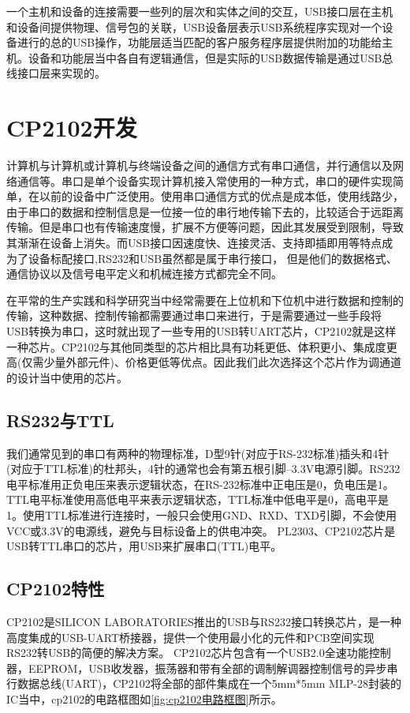 	一个主机和设备的连接需要一些列的层次和实体之间的交互，USB接口层在主机和设备间提供物理、信号包的关联，USB设备层表示USB系统程序实现对一个设备进行的总的USB操作，功能层适当匹配的客户服务程序层提供附加的功能给主机。设备和功能层当中各自有逻辑通信，但是实际的USB数据传输是通过USB总线接口层来实现的\cite{USB开发手册}\cite{圈圈教你玩USB}。


\section{CP2102开发}

	计算机与计算机或计算机与终端设备之间的通信方式有串口通信，并行通信以及网络通信等。串口是单个设备实现计算机接入常使用的一种方式，串口的硬件实现简单，在以前的设备中广泛使用。使用串口通信方式的优点是成本低，使用线路少，由于串口的数据和控制信息是一位接一位的串行地传输下去的，比较适合于远距离传输。但是串口也有传输速度慢，扩展不方便等问题，因此其发展受到限制，导致其渐渐在设备上消失。而USB接口因速度快、连接灵活、支持即插即用等特点成为了设备标配接口,RS232和USB虽然都是属于串行接口， 但是他们的数据格式、通信协议以及信号电平定义和机械连接方式都完全不同\cite{何源2006USB}。
	
	在平常的生产实践和科学研究当中经常需要在上位机和下位机中进行数据和控制的传输，这种数据、控制传输都需要通过串口来进行，于是需要通过一些手段将USB转换为串口，这时就出现了一些专用的USB转UART芯片，CP2102就是这样一种芯片。CP2102与其他同类型的芯片相比具有功耗更低、体积更小、集成度更高(仅需少量外部元件)、价格更低等优点。因此我们此次选择这个芯片作为调通道的设计当中使用的芯片。	

\subsection{RS232与TTL}
	我们通常见到的串口有两种的物理标准，D型9针(对应于RS-232标准)插头和4针(对应于TTL标准)的杜邦头，4针的通常也会有第五根引脚--3.3V电源引脚。RS232电平标准用正负电压来表示逻辑状态，在RS-232标准中正电压是0，负电压是1。TTL电平标准使用高低电平来表示逻辑状态，TTL标准中低电平是0，高电平是1。使用TTL标准进行连接时，一般只会使用GND、RXD、TXD引脚，不会使用VCC或3.3V的电源线，避免与目标设备上的供电冲突。
	PL2303、CP2102芯片是USB转TTL串口的芯片，用USB来扩展串口(TTL)电平。
	
 
\subsection{CP2102特性}
	CP2102是SILICON LABORATORIES推出的USB与RS232接口转换芯片，是一种高度集成的USB-UART桥接器，提供一个使用最小化的元件和PCB空间实现RS232转USB的简便的解决方案。
	CP2102芯片包含有一个USB2.0全速功能控制器，EEPROM，USB收发器，振荡器和带有全部的调制解调器控制信号的异步串行数据总线(UART)，CP2102将全部的部件集成在一个5mm*5mm MLP-28封装的IC当中\cite{CP2102}，cp2102的电路框图如\autoref{fig:cp2102电路框图}所示。

